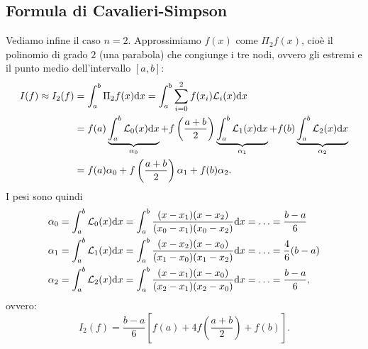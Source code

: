 \subsection{Formula di Cavalieri-Simpson}
Vediamo infine il caso $n=2$. Approssimiamo $f( x)$ come $\Pi _{2} f( x)$, cioè il polinomio di grado $2$ (una parabola) che congiunge i tre nodi, ovvero gli estremi e il punto medio dell'intervallo $[ a,b]$:
\begin{align*}
I( f) \approx I_{2}( f) & =\int\nolimits ^{b}_{a} \Pi _{2} f( x) \mathrm d x=\int\nolimits ^{b}_{a}\sum\limits ^{2}_{i=0} f( x_{i})\mathcal{L}_{i}( x) \mathrm d x\\
 & =f( a)\underbrace{\int\nolimits ^{b}_{a}\mathcal{L}_{0}( x) \mathrm d x}_{\alpha _{0}} +f\left(\frac{a+b}{2}\right)\underbrace{\int\nolimits ^{b}_{a}\mathcal{L}_{1}( x) \mathrm d x}_{\alpha _{1}} +f( b)\underbrace{\int\nolimits ^{b}_{a}\mathcal{L}_{2}( x) \mathrm d x}_{\alpha _{2}}\\
 & =f( a) \alpha _{0} +f\left(\frac{a+b}{2}\right) \alpha _{1} +f( b) \alpha _{2}.
\end{align*}
I pesi sono quindi
\begin{equation*}
\begin{aligned}
\alpha _{0} & =\int\nolimits ^{b}_{a}\mathcal{L}_{0}( x) \mathrm d x=\int\nolimits ^{b}_{a}\frac{( x-x_{1})( x-x_{2})}{( x_{0} -x_{1})( x_{0} -x_{2})} \mathrm d x=\dotsc =\frac{b-a}{6}\\
\alpha _{1} & =\int\nolimits ^{b}_{a}\mathcal{L}_{1}( x) \mathrm d x=\int\nolimits ^{b}_{a}\frac{( x-x_{2})( x-x_{0})}{( x_{1} -x_{0})( x_{1} -x_{2})} \mathrm d x=\dotsc =\frac{4}{6}( b-a)\\
\alpha _{2} & =\int\nolimits ^{b}_{a}\mathcal{L}_{2}( x) \mathrm d x=\int\nolimits ^{b}_{a}\frac{( x-x_{1})( x-x_{0})}{( x_{2} -x_{1})( x_{2} -x_{0})} \mathrm d x=\dotsc =\frac{b-a}{6},
\end{aligned}
\end{equation*}
ovvero:
\begin{equation*}
I_{2}( f) =\frac{b-a}{6}\left[ f( a) +4f\left(\frac{a+b}{2}\right) +f( b)\right].
\end{equation*}

